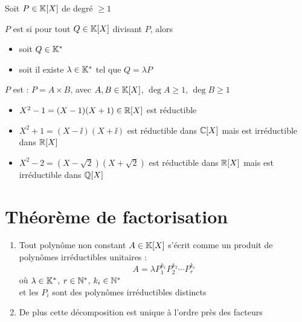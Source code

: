 \begin{frame}
Soit  $P \in\mathbb{K}[X]$ de degré $\ge 1$
\begin{mydefinition}
$P$ est  si pour tout $Q \in\mathbb{K}[X]$ divisant $P$, alors
\begin{itemize}
  \item soit $Q \in\mathbb{K}^*$
  \item soit il existe $\lambda \in\mathbb{K}^*$ tel que $Q=\lambda P$
\end{itemize}
\end{mydefinition}

\pause

$P$ est  : $P=A\times B$, avec $A, B \in \mathbb{K}[X]$,
 $\deg A \ge 1$, $\deg B \ge 1$

\medskip
\pause 

\begin{exemple}
\begin{itemize}
  \item $X^2-1=(X-1)(X+1)\in\mathbb{R}[X]$ est réductible
\pause 
  \item $X^2+1=(X-\ii)(X+\ii)$ est réductible dans $\mathbb{C}[X]$ mais est irréductible dans $\mathbb{R}[X]$
\pause 
  \item $X^2-2=(X-\sqrt2)(X+\sqrt2)$ est réductible dans $\mathbb{R}[X]$ mais est irréductible dans $\mathbb{Q}[X]$ 
\end{itemize}
\end{exemple}

\end{frame}

\section{Théorème de factorisation}

\begin{frame}
\begin{theoreme}
\begin{enumerate}
  \item Tout polynôme non constant $A\in\mathbb{K}[X]$ s'écrit comme un produit de polynômes
irréductibles unitaires :
$$A= \lambda  P_1^{k_1}P_2^{k_2} \cdots P_r^{k_r}$$
 où $\lambda\in\mathbb{K}^*$, $r \in \mathbb{N}^*$, $k_i \in \mathbb{N}^*$ \\
et les $P_i$ sont des polynômes irréductibles distincts
\pause   
  \item De plus cette décomposition est unique à l'ordre près des facteurs
\end{enumerate}
\end{theoreme}

\end{frame}


